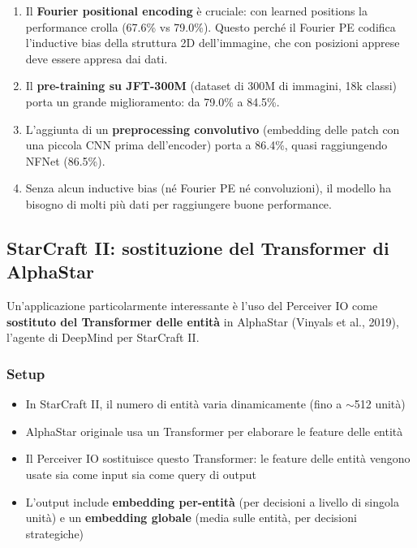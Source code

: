 \documentclass[12pt,a4paper]{article}
\begin{document}
\begin{notabox}
\begin{enumerate}
    \item Il \textbf{Fourier positional encoding} \`e cruciale: con learned positions la performance crolla (67.6\% vs 79.0\%). Questo perch\'e il Fourier PE codifica l'inductive bias della struttura 2D dell'immagine, che con posizioni apprese deve essere appresa dai dati.
    \item Il \textbf{pre-training su JFT-300M} (dataset di 300M di immagini, 18k classi) porta un grande miglioramento: da 79.0\% a 84.5\%.
    \item L'aggiunta di un \textbf{preprocessing convolutivo} (embedding delle patch con una piccola CNN prima dell'encoder) porta a 86.4\%, quasi raggiungendo NFNet (86.5\%).
    \item Senza alcun inductive bias (n\'e Fourier PE n\'e convoluzioni), il modello ha bisogno di molti pi\`u dati per raggiungere buone performance.
\end{enumerate}
\end{notabox}


\subsection{StarCraft II: sostituzione del Transformer di AlphaStar}

Un'applicazione particolarmente interessante \`e l'uso del Perceiver IO come \textbf{sostituto del Transformer delle entit\`a} in AlphaStar (Vinyals et al., 2019), l'agente di DeepMind per StarCraft II.

\subsubsection{Setup}

\begin{itemize}
    \item In StarCraft II, il numero di entit\`a varia dinamicamente (fino a $\sim$512 unit\`a)
    \item AlphaStar originale usa un Transformer per elaborare le feature delle entit\`a
    \item Il Perceiver IO sostituisce questo Transformer: le feature delle entit\`a vengono usate sia come input sia come query di output
    \item L'output include \textbf{embedding per-entit\`a} (per decisioni a livello di singola unit\`a) e un \textbf{embedding globale} (media sulle entit\`a, per decisioni strategiche)
\end{itemize}
\end{document}
